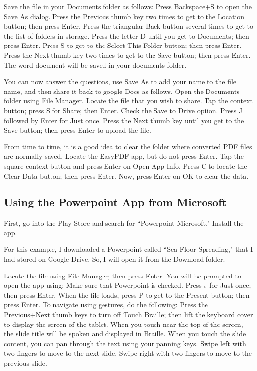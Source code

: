 \documentclass[10pt,letterpaper,twoside]{report}
\begin{document}
{{{Save the file in your Documents folder as follows:
Press Backspace+S to open the Save As dialog.
Press the Previous thumb key two times to get to the Location button; then press Enter.
Press the triangular Back button several times to get to the list of folders in storage.
Press the letter D until you get to Documents; then press Enter.
Press S to get to the Select This Folder button; then press Enter.
Press the Next thumb key two times to get to the Save button; then press Enter. The word document will be saved in your documents folder.

You can now answer the questions, use Save As to add your name to the file name, and then share it back to google Docs as follows.
Open the Documents folder using File Manager.
Locate the file that you wish to share.
Tap the context button; press S for Share; then Enter.
Check the Save to Drive option.
Press J followed by Enter for Just once.
Press the Next thumb key until you get to the Save button; then press Enter to upload the file.

From time to time, it is a good idea to clear the folder where converted PDF files are normally saved.
Locate the EasyPDF app, but do not press Enter.
Tap the square context button and press Enter on Open App Info.
Press C to locate the Clear Data button; then press Enter. Now, press Enter on OK to clear the data.

\subsection{Using the Powerpoint App from Microsoft}

First, go into the Play Store and search for ``Powerpoint Microsoft."
Install the app.

For this example, I downloaded a Powerpoint called ``Sea Floor Spreading," that I had stored on Google Drive. So, I will open it from the Download folder.

Locate the file using File Manager; then press Enter.
You will be prompted to open the app using:
Make sure that Powerpoint is checked.
Press J for Just once; then press Enter.
When the file loads, press P to get to the Present button; then press Enter.
To navigate using gestures, do the following:
Press the Previous+Next thumb keys to turn off Touch Braille; then lift the keyboard cover to display the screen of the tablet.
When you touch near the top of the screen, the slide title will be spoken and displayed in Braille.
When you touch the slide content, you can pan through the text using your panning keys.
Swipe left with two fingers to move to the next slide.
Swipe right with two fingers to move to the previous slide.

}}}
\end{document}
